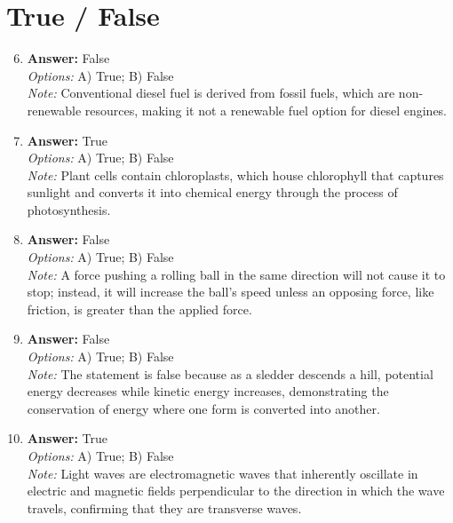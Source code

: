 \documentclass[12pt]{article}
\begin{document}
\section*{True / False}
\begin{enumerate}[label=\arabic*.]
\setcounter{enumi}{5}
\item \textbf{Answer:} False
\\ \textit{Options:} A) True; B) False
\\ \textit{Note:} Conventional diesel fuel is derived from fossil fuels, which are non-renewable resources, making it not a renewable fuel option for diesel engines.
\item \textbf{Answer:} True
\\ \textit{Options:} A) True; B) False
\\ \textit{Note:} Plant cells contain chloroplasts, which house chlorophyll that captures sunlight and converts it into chemical energy through the process of photosynthesis.
\item \textbf{Answer:} False
\\ \textit{Options:} A) True; B) False
\\ \textit{Note:} A force pushing a rolling ball in the same direction will not cause it to stop; instead, it will increase the ball's speed unless an opposing force, like friction, is greater than the applied force.
\item \textbf{Answer:} False
\\ \textit{Options:} A) True; B) False
\\ \textit{Note:} The statement is false because as a sledder descends a hill, potential energy decreases while kinetic energy increases, demonstrating the conservation of energy where one form is converted into another.
\item \textbf{Answer:} True
\\ \textit{Options:} A) True; B) False
\\ \textit{Note:} Light waves are electromagnetic waves that inherently oscillate in electric and magnetic fields perpendicular to the direction in which the wave travels, confirming that they are transverse waves.
\end{enumerate}
\end{document}
